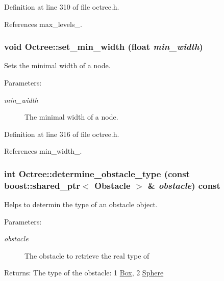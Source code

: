 Definition at line 310 of file octree.h.

References max\_\-levels\_\-.\hypertarget{class_octree_046a7db4d122f2b8ef6a5188ef78ffda}{
\subsubsection[set\_\-min\_\-width]{\setlength{\rightskip}{0pt plus 5cm}void Octree::set\_\-min\_\-width (float {\em min\_\-width})}}
\label{class_octree_046a7db4d122f2b8ef6a5188ef78ffda}


Sets the minimal width of a node. \begin{Desc}
\item[Parameters:]
\begin{description}
\item[{\em min\_\-width}]The minimal width of a node. \end{description}
\end{Desc}


Definition at line 316 of file octree.h.

References min\_\-width\_\-.\hypertarget{class_octree_a721cdd20e21a952ea04721ae756d091}{
\subsubsection[determine\_\-obstacle\_\-type]{\setlength{\rightskip}{0pt plus 5cm}int Octree::determine\_\-obstacle\_\-type (const boost::shared\_\-ptr$<$ Obstacle $>$ \& {\em obstacle}) const}}
\label{class_octree_a721cdd20e21a952ea04721ae756d091}


Helps to determin the type of an obstacle object. 

\begin{Desc}
\item[Parameters:]
\begin{description}
\item[{\em obstacle}]The obstacle to retrieve the real type of \end{description}
\end{Desc}
\begin{Desc}
\item[Returns:]The type of the obstacle: 1 \hyperlink{class_box}{Box}, 2 \hyperlink{class_sphere}{Sphere} \end{Desc}


